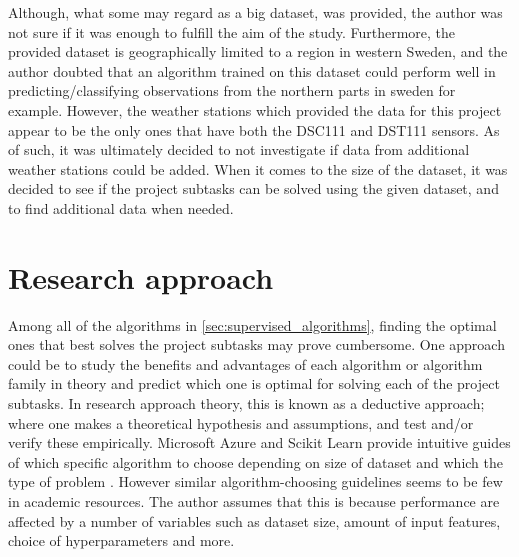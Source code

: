 	 Although, what some may regard as a big dataset, was provided, the author was not sure if it was enough to fulfill the aim of the study. Furthermore, the provided dataset is geographically limited to a region in western Sweden, and the author doubted that an algorithm trained on this dataset could perform well in predicting/classifying observations from the northern parts in sweden for example. However, the weather stations which provided the data for this project appear to be the only ones that have both the DSC111 and DST111 sensors. As of such, it was ultimately decided to not investigate if data from additional weather stations could be added. When it comes to the size of the dataset, it was decided to see if the project subtasks can be solved using the given dataset, and to find additional data when needed.



\section{Research approach}
		Among all of the algorithms in \ref{sec:supervised_algorithms}, finding the optimal ones that best solves the project subtasks may prove cumbersome. One approach could be to study the benefits and advantages of each algorithm or algorithm family in theory and predict which one is optimal for solving each of the project subtasks. In research approach theory, this is known as a deductive approach; where one makes a theoretical hypothesis and assumptions, and test and/or verify these empirically. Microsoft Azure and Scikit Learn provide intuitive guides of which specific algorithm to choose depending on size of dataset and which the type of problem \cite{WEBSITE:20, WEBSITE:21}. However similar algorithm-choosing guidelines seems to be few in academic resources. The author assumes that this is because performance are affected by a number of variables such as dataset size, amount of input features, choice of hyperparameters and more. 

